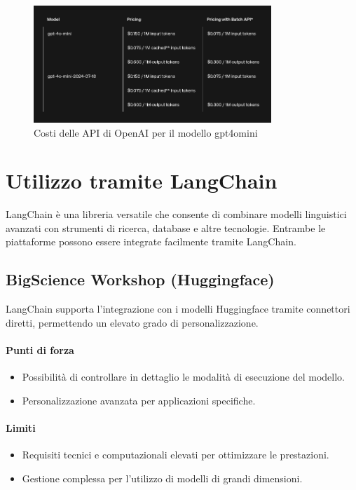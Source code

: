 \documentclass{article}
\begin{document}
\begin{figure}[H]
    \centering
    \includegraphics[width=0.8\textwidth]{img/costi_gpt4omini.png}
    \caption{Costi delle API di OpenAI per il modello gpt4omini}
    \label{fig:costi_openai_gpt4omini}
\end{figure}




\section{Utilizzo tramite LangChain}
LangChain è una libreria versatile che consente di combinare modelli linguistici avanzati con strumenti di ricerca, database e altre tecnologie. Entrambe le piattaforme possono essere integrate facilmente tramite LangChain.

\subsection{BigScience Workshop (Huggingface)}
LangChain supporta l'integrazione con i modelli Huggingface tramite connettori diretti, permettendo un elevato grado di personalizzazione.

\paragraph*{Punti di forza}
\begin{itemize}
    \item Possibilità di controllare in dettaglio le modalità di esecuzione del modello.
    \item Personalizzazione avanzata per applicazioni specifiche.
\end{itemize}

\paragraph*{Limiti}
\begin{itemize}
    \item Requisiti tecnici e computazionali elevati per ottimizzare le prestazioni.
    \item Gestione complessa per l'utilizzo di modelli di grandi dimensioni.
\end{itemize}
\end{document}
